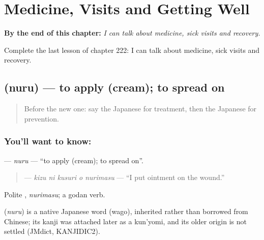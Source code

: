 
\chapter{Medicine, Visits and Getting Well}
\label{ch:ja-medicine-visits-and-getting-well}

\begin{chapteropening}
\textbf{By the end of this chapter:} \emph{I can talk about medicine, sick visits and recovery.}

Complete the last lesson of chapter 222: I can talk about medicine, sick visits and recovery.
\end{chapteropening}

\section[\texorpdfstring{\ja{ぬる} (nuru)}{ぬる (nuru)}]{ (nuru) — to apply (cream); to spread on}

\label{lesson:JA-C222-nuru}



\begin{quote}
Before the new one: say the Japanese for treatment, then the Japanese for prevention.
\end{quote}

\subsection*{You'll want to know: }
\textbf{} — \emph{nuru} — \textquotedblleft{}to apply (cream); to spread on\textquotedblright{}.

\begin{quote}
\textbf{  } — \emph{kizu ni kusuri o nurimasu} — \textquotedblleft{}I put ointment on the wound.\textquotedblright{}
\end{quote}

Polite \textbf{}, \emph{nurimasu}; a godan verb.

\begin{cousinweb}
\textbf{} (\emph{nuru}) is a native Japanese word (wago), inherited rather than borrowed from Chinese; its kanji was attached later as a kun'yomi, and its older origin is not settled (JMdict, KANJIDIC2).
\end{cousinweb}


